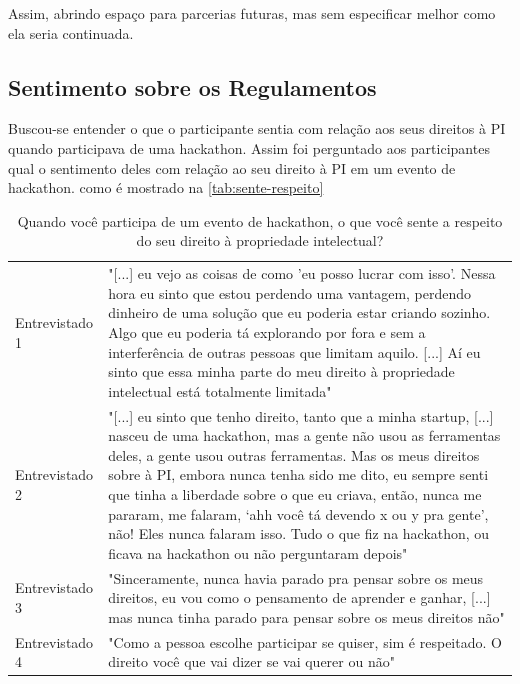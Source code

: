 Assim, abrindo espaço para parcerias futuras, mas sem especificar melhor como ela seria continuada.







\subsection{Sentimento sobre os Regulamentos}

Buscou-se entender o que o participante sentia com relação aos seus direitos à PI quando participava de uma hackathon. Assim foi perguntado aos participantes qual o sentimento deles com relação ao seu direito à PI em um evento de hackathon. 
como é mostrado na \autoref{tab:sente-respeito}

\begin{table}[H]
\centering
\caption{Quando você participa de um evento de hackathon, o que você sente a respeito do seu direito à propriedade intelectual?}
\label{tab:sente-respeito}
\begin{tabular}{l|p{}}
Entrevistado 1 &
  "{[}...{]} eu vejo as coisas de como 'eu posso lucrar com isso'.  Nessa hora eu sinto que estou perdendo uma vantagem, perdendo dinheiro de uma solução que eu poderia estar criando sozinho. Algo que eu poderia tá explorando por fora e sem a interferência de outras pessoas que limitam aquilo. {[}...{]} Aí eu sinto que essa minha parte do meu direito à propriedade intelectual está totalmente limitada" \\
Entrevistado 2 &
  "{[}...{]} eu sinto que tenho direito, tanto que a minha startup, {[}...{]} nasceu de uma hackathon, mas a gente não usou as ferramentas deles, a gente usou outras ferramentas. Mas os meus direitos sobre  à PI, embora nunca tenha sido me dito, eu sempre senti que tinha a liberdade sobre o que eu criava, então, nunca me pararam, me falaram, ‘ahh você tá devendo x ou y pra gente’, não! Eles nunca falaram isso. Tudo o que fiz na hackathon, ou ficava na hackathon ou não perguntaram depois" \\
Entrevistado 3 &
  "Sinceramente, nunca havia parado pra pensar sobre os meus direitos, eu vou como o pensamento de aprender e ganhar, {[}...{]} mas nunca tinha parado para pensar sobre os meus direitos não" \\
Entrevistado 4 &
  "Como a pessoa escolhe participar se quiser, sim é respeitado. O direito você que vai dizer se vai querer ou não"
\end{tabular}
\end{table}




